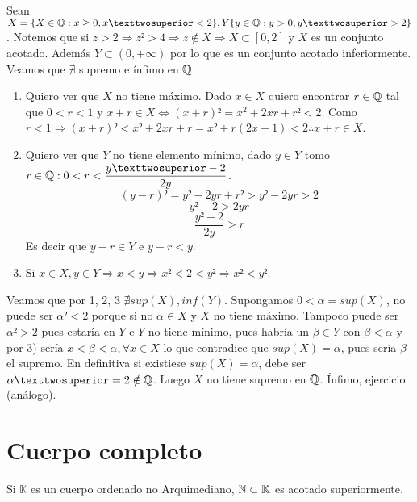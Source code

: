 \begin{eg}
    Sean $X = \{ X \in \Q : x \geq 0, x² < 2 \}, Y \{ y \in \Q : y>0, y² > 2 \}$. Notemos que si $z>2 \Rightarrow z² > 4 \Rightarrow z \notin X \Rightarrow X \subset [0, 2]$ y $X$ es un conjunto acotado. Además $Y \subset (0, +\infty)$ por lo que es un conjunto acotado inferiormente. Veamos que $\nexists$ supremo e ínfimo en $\mathbb{Q}$. \begin{enumerate}
        \item Quiero ver que $X$ no tiene máximo. Dado $x \in X$ quiero encontrar $r \in \mathbb{Q}$ tal que $0<r<1$ y $x+r \in X \iff (x+r)² =x^2+2xr+r² < 2$. Como $r<1 \Rightarrow (x+r)²<x²+2xr+r=x²+r(2x+1)<2 \therefore x+r \in X$.
        \item Quiero ver que $Y$ no tiene elemento mínimo, dado $y \in Y$ tomo $r \in \Q : 0 < r < \dfrac{y²-2}{2y}$.
              \begin{equation}
                  (y - r)² = y² - 2yr + r² > y² - 2yr > 2
              \end{equation}
              \begin{equation}
                  y² - 2 > 2yr
              \end{equation}
              \begin{equation}
                  \dfrac{y²-2}{2y}>r
              \end{equation}
              Es decir que $y-r \in Y$ e $y-r < y$.
        \item Si $x \in X, y \in Y \Rightarrow x < y \Rightarrow x² < 2 < y² \Rightarrow x² < y²$.
    \end{enumerate}

    Veamos que por 1, 2, 3 $\nexists sup(X), inf(Y)$. Supongamos $0< \alpha = sup(X)$, no puede ser $\alpha²<2$ porque si no $\alpha \in X$ y $X$ no tiene máximo. Tampoco puede ser $\alpha² > 2$ pues estaría en $Y$ e $Y$ no tiene mínimo, pues habría un $\beta \in Y$ con $\beta < \alpha$ y por 3) sería $x < \beta < \alpha, \forall x \in X$ lo que contradice que $sup(X) = \alpha$, pues sería $\beta$ el supremo.
    En definitiva si existiese $sup(X) = \alpha$, debe ser $\alpha² = 2 \notin \Q$. Luego $X$ no tiene supremo en $\mathbb{Q}$.
    Ínfimo, ejercicio (análogo).
\end{eg}

\section{Cuerpo completo}

\begin{definition}
    Si $\mathbb{K}$ es un cuerpo ordenado no Arquimediano, $\mathbb{N} \subset \mathbb{K}$ es acotado superiormente.
\end{definition}


